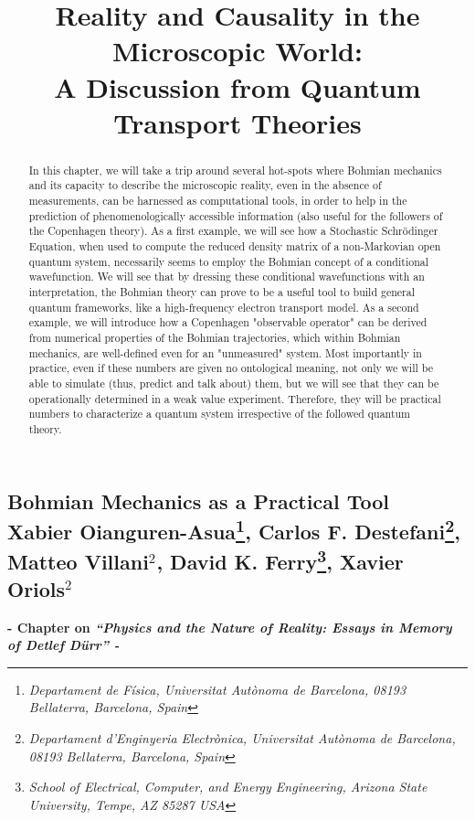 \documentclass[11pt, a4paper]{article} %
\title{\vspace{-2cm} {\bf Reality and Causality in the Microscopic World:\\ A Discussion from Quantum Transport Theories}
\vspace{-0.4cm}}
\date{\vspace{-11ex}}
\begin{document}
\begin{center}
\section*{ Bohmian Mechanics as a Practical Tool \vspace{0.2cm}\vspace{0.1cm}\\ \small Xabier Oianguren-Asua{\normalsize \footnote{\em Departament de Física, Universitat Autònoma de Barcelona, 08193 Bellaterra, Barcelona, Spain}}, Carlos F. Destefani{\normalsize\footnote{\em Departament d’Enginyeria Electrònica, Universitat Autònoma de Barcelona, 08193 Bellaterra, Barcelona, Spain}}, Matteo Villani{\normalsize$^2$}, David K. Ferry{\normalsize\footnote{\em School of Electrical, Computer, and Energy Engineering, Arizona State University, Tempe,
AZ 85287 USA}}, Xavier Oriols{\normalsize$^2$}}

\vspace{-0.5cm}
{\bf \small - Chapter on {\em “Physics and the Nature of Reality: Essays in Memory of Detlef Dürr” - }}\vspace{-0.32cm}
\end{center}
\vspace{0.2cm}
\begin{abstract}
\vspace{-0.3cm}
\hspace{5mm}In this chapter, we will take a trip around several hot-spots where Bohmian mechanics and its capacity to describe the microscopic reality, even in the absence of measurements, can be harnessed as computational tools, in order to help in the prediction of phenomenologically accessible information (also useful for the followers of the Copenhagen theory). As a first example, we will see how a Stochastic Schrödinger Equation, when used to compute the reduced density matrix of a non-Markovian open quantum system, necessarily seems to employ the Bohmian concept of a conditional wavefunction. We will see that by dressing these conditional wavefunctions with an interpretation, the Bohmian theory can prove to be a useful tool to build general quantum frameworks, like a high-frequency electron transport model. As a second example, we will introduce how a Copenhagen "observable operator" can be derived from numerical properties of the Bohmian trajectories, which within Bohmian mechanics, are well-defined even for an "unmeasured" system. Most importantly in practice, even if these numbers are given no ontological meaning, not only we will be able to simulate (thus, predict and talk about) them, but we will see that they can be operationally determined in a weak value experiment. Therefore, they will be practical numbers to characterize a quantum system irrespective of the followed quantum theory.
\end{abstract}
\end{document}
